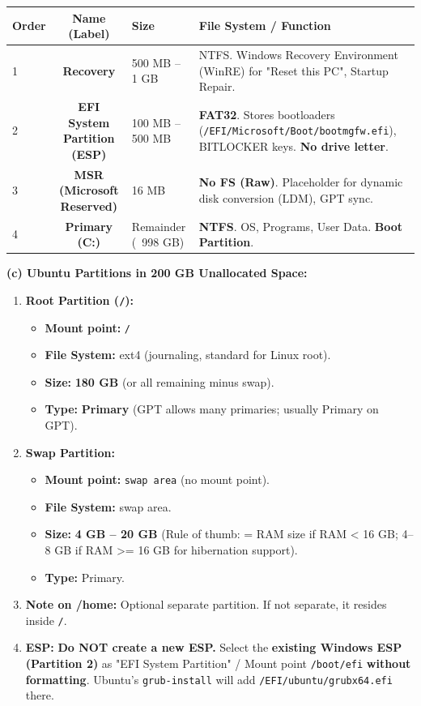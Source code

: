 \documentclass[11pt]{article}
\newcommand{\cle}[1]{{\popxbold\color{popdark}#1}}
\begin{document}
\begin{exoresolu}
\begin{center}
\begin{tabularx}{\linewidth}{|l|c|l|X|}
\hline
\rowcolor{popblueL}
\textbf{Order} & \textbf{Name (Label)} & \textbf{Size} & \textbf{File System / Function} \\
\hline
1 & \textbf{Recovery} & 500 MB -- 1 GB & NTFS. Windows Recovery Environment (WinRE) for "Reset this PC", Startup Repair. \\
\hline
2 & \textbf{EFI System Partition (ESP)} & 100 MB -- 500 MB & \textbf{FAT32}. Stores bootloaders (\texttt{/EFI/Microsoft/Boot/bootmgfw.efi}), BITLOCKER keys. \textbf{No drive letter}. \\
\hline
3 & \textbf{MSR (Microsoft Reserved)} & 16 MB & \textbf{No FS (Raw)}. Placeholder for dynamic disk conversion (LDM), GPT sync. \\
\hline
4 & \textbf{Primary (C:)} & Remainder (~998 GB) & \textbf{NTFS}. OS, Programs, User Data. \textbf{Boot Partition}. \\
\hline
\end{tabularx}
\end{center}

\noindent\textbf{(c) Ubuntu Partitions in 200 GB Unallocated Space:}

\begin{enumerate}
    \item \textbf{Root Partition (\texttt{/}):}
    \begin{itemize}
        \item \textbf{Mount point:} \texttt{/}
        \item \textbf{File System:} \cle{ext4} (journaling, standard for Linux root).
        \item \textbf{Size:} \textbf{180 GB} (or all remaining minus swap).
        \item \textbf{Type:} \textbf{Primary} (GPT allows many primaries; usually Primary on GPT).
    \end{itemize}
    \item \textbf{Swap Partition:}
    \begin{itemize}
        \item \textbf{Mount point:} \texttt{swap area} (no mount point).
        \item \textbf{File System:} \cle{swap area}.
        \item \textbf{Size:} \textbf{4 GB -- 20 GB} (Rule of thumb: = RAM size if RAM < 16 GB; 4--8 GB if RAM >= 16 GB for hibernation support).
        \item \textbf{Type:} Primary.
    \end{itemize}
    \item \textbf{Note on /home:} Optional separate partition. If not separate, it resides inside \texttt{/}.
    \item \textbf{ESP:} \textbf{Do NOT create a new ESP.} Select the \textbf{existing Windows ESP (Partition 2)} as "EFI System Partition" / Mount point \texttt{/boot/efi} \textbf{without formatting}. Ubuntu's \texttt{grub-install} will add \texttt{/EFI/ubuntu/grubx64.efi} there.
\end{enumerate}


\end{exoresolu}
\end{document}
